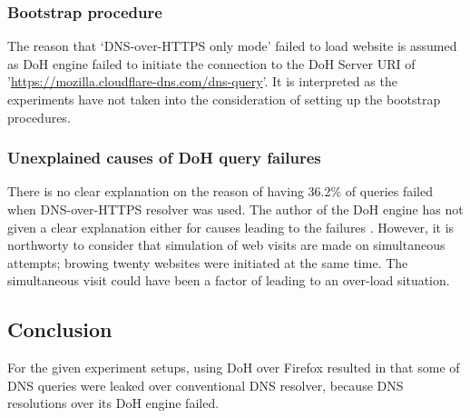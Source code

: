 \subsubsection{Bootstrap procedure}\label{bootstrap}
The reason that `DNS-over-HTTPS only mode' failed to load website is assumed as DoH engine failed to initiate the connection to the DoH Server URI of '\url{https://mozilla.cloudflare-dns.com/dns-query}'. It is interpreted as the experiments have not taken into the consideration of setting up the bootstrap procedures.

\subsubsection{Unexplained causes of DoH query failures}
There is no clear explanation on the reason of having 36.2\% of queries failed when DNS-over-HTTPS resolver was used.
The author of the DoH engine has not given a clear explanation either for causes leading to the failures \cite{daniel-doh}.
However, it is northworty to consider that simulation of web visits are made on simultaneous attempts; browing twenty websites were initiated at the same time.
The simultaneous visit could have been a factor of leading to an over-load situation.

\subsection{Conclusion}
For the given experiment setups, using DoH over Firefox resulted in that some of DNS queries were leaked over conventional DNS resolver, because DNS resolutions over its DoH engine failed.